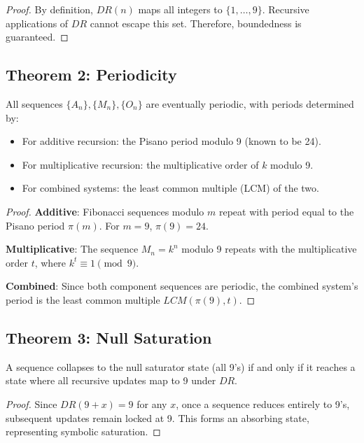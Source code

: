 \documentclass[12pt]{article}
\begin{document}
\begin{proof}
By definition, \( DR(n) \) maps all integers to \( \{1, \dots, 9\} \). Recursive applications of \( DR \) cannot escape this set. Therefore, boundedness is guaranteed.
\end{proof}

\subsection{Theorem 2: Periodicity}

\begin{theorem}
All sequences \( \{A_n\}, \{M_n\}, \{O_n\} \) are eventually periodic, with periods determined by:
\begin{itemize}
    \item For additive recursion: the Pisano period modulo 9 (known to be 24).
    \item For multiplicative recursion: the multiplicative order of \( k \) modulo 9.
    \item For combined systems: the least common multiple (LCM) of the two.
\end{itemize}
\end{theorem}

\begin{proof}
\textbf{Additive}: Fibonacci sequences modulo \( m \) repeat with period equal to the Pisano period \( \pi(m) \). For \( m = 9 \), \( \pi(9) = 24 \).

\textbf{Multiplicative}: The sequence \( M_n = k^n \) modulo 9 repeats with the multiplicative order \( t \), where \( k^t \equiv 1 \pmod{9} \).

\textbf{Combined}: Since both component sequences are periodic, the combined system’s period is the least common multiple \( LCM(\pi(9), t) \).
\end{proof}

\subsection{Theorem 3: Null Saturation}

\begin{theorem}
A sequence collapses to the null saturator state (all 9's) if and only if it reaches a state where all recursive updates map to 9 under \( DR \).
\end{theorem}

\begin{proof}
Since \( DR(9 + x) = 9 \) for any \( x \), once a sequence reduces entirely to 9's, subsequent updates remain locked at 9. This forms an absorbing state, representing symbolic saturation.
\end{proof}
\end{document}
